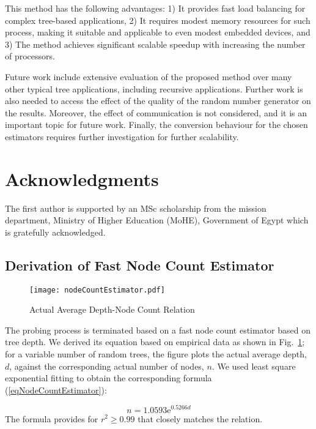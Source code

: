\documentclass[conference,compsoc]{IEEEtran}
\begin{document}
This method has the following advantages: 1) It provides fast load balancing for complex tree-based applications, 2) It requires modest memory resources for such process, making it suitable and applicable to even modest embedded devices, and 3) The method achieves significant scalable speedup with increasing the number of processors.

Future work include extensive evaluation of the proposed method over many other typical tree applications, including recursive applications. Further work is also needed to access the effect of the quality of the random number generator on the results. Moreover, the effect of communication is not considered, and it is an important topic for future work. Finally, the conversion behaviour for the chosen estimators requires further investigation for further scalability.


\section*{Acknowledgments}
The first author is supported by an MSc scholarship from the mission department, Ministry of Higher Education (MoHE), Government of Egypt which is gratefully acknowledged.





\begin{appendices}

\section{Derivation of Fast Node Count Estimator} \label{secCountEstimator}
\begin{figure}[h]
	\centering
	\texttt{[image: nodeCountEstimator.pdf]}
	\caption{\label{figNodeCountEstimator}Actual Average Depth-Node Count Relation}
\end{figure}
The probing process is terminated based on a fast node count estimator based on tree depth. We derived its equation based on empirical data as shown in Fig.~\ref{figNodeCountEstimator}; for a variable number of random trees, the figure plots the actual average depth, $d$, against the corresponding actual number of nodes, $n$. We used least square exponential fitting to obtain the corresponding formula (\ref{eqNodeCountEstimator}):

\begin{equation}
n=1.0593\mathrm{e}^{0.5266d}
\label{eqNodeCountEstimator}
\end{equation}
The formula provides for $r^{2}\ge0.99$ that closely matches the relation.
\end{appendices}
\end{document}

